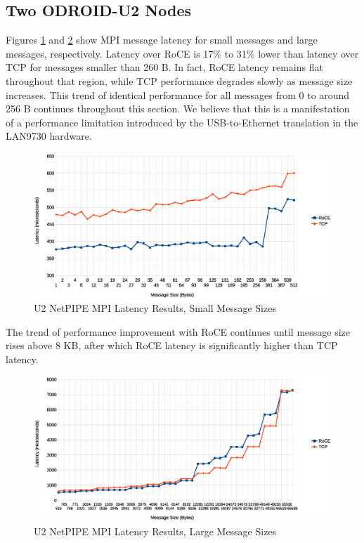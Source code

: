 \documentclass[11pt]{book}
\begin{document}
\subsection{\textbf{Two ODROID-U2 Nodes}}

Figures \ref{npmpi-llat} and \ref{npmpi-hlat} show MPI message latency for small
messages and large messages, respectively. Latency over RoCE is 17\% to 31\%
lower than latency over TCP for messages smaller than 260 B. In fact, RoCE
latency remains flat throughout that region, while TCP performance degrades
slowly as message size increases. This trend of identical performance for all
messages from 0 to around 256 B continues throughout this section. We believe
that this is a manifestation of a performance limitation introduced by the
USB-to-Ethernet translation in the LAN9730 hardware.

\begin{figure}[h]
\includegraphics[width=\textwidth]{netpipe_lat_small}
\caption{U2 NetPIPE MPI Latency Results, Small Message Sizes}
\label{npmpi-llat}
\end{figure}

The trend of performance improvement with RoCE continues until message size
rises above 8 KB, after which RoCE latency is significantly higher than TCP
latency.

\begin{figure}[h]
\includegraphics[width=\textwidth]{netpipe_lat_large}
\caption{U2 NetPIPE MPI Latency Results, Large Message Sizes}
\label{npmpi-hlat}
\end{figure}
\end{document}
